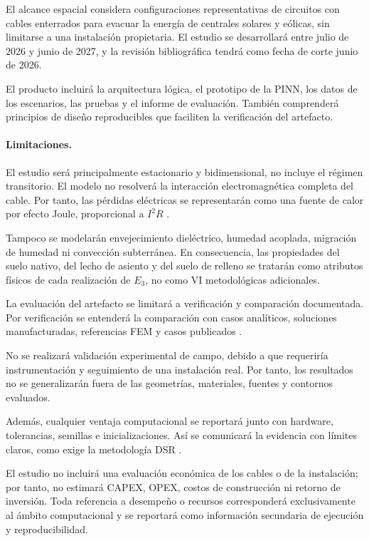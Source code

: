El alcance espacial considera configuraciones representativas de circuitos con cables enterrados para evacuar la energía de centrales solares y eólicas, sin limitarse a una instalación propietaria. El estudio se desarrollará entre julio de 2026 y junio de 2027, y la revisión bibliográfica tendrá como fecha de corte junio de 2026.

El producto incluirá la arquitectura lógica, el prototipo de la PINN, los datos de los escenarios, las pruebas y el informe de evaluación. También comprenderá principios de diseño reproducibles que faciliten la verificación del artefacto.

\paragraph{Limitaciones.}

El estudio será principalmente estacionario y bidimensional, no incluye el régimen transitorio. El modelo no resolverá la interacción electromagnética completa del cable. Por tanto, las pérdidas eléctricas se representarán como una fuente de calor por efecto Joule, proporcional a $I^2R$ \parencites[752--760]{neher1957}[cláusulas 4--5]{iec60287}.

Tampoco se modelarán envejecimiento dieléctrico, humedad acoplada, migración de humedad ni convección subterránea. En consecuencia, las propiedades del suelo nativo, del lecho de asiento y del suelo de relleno se tratarán como atributos físicos de cada realización de $E_3$, no como VI metodológicas adicionales.

La evaluación del artefacto se limitará a verificación y comparación documentada. Por verificación se entenderá la comparación con casos analíticos, soluciones manufacturadas, referencias FEM y casos publicados \parencites{cigre2022}[3--4,93--99]{cigre2025}.

No se realizará validación experimental de campo, debido a que requeriría instrumentación y seguimiento de una instalación real. Por tanto, los resultados no se generalizarán fuera de las geometrías, materiales, fuentes y contornos evaluados.

Además, cualquier ventaja computacional se reportará junto con hardware, tolerancias, semillas e inicializaciones. Así se comunicará la evidencia con límites claros, como exige la metodología DSR \parencite[350--351]{gregor2013}.

El estudio no incluirá una evaluación económica de los cables o de la instalación; por tanto, no estimará CAPEX, OPEX, costos de construcción ni retorno de inversión. Toda referencia a desempeño o recursos corresponderá exclusivamente al ámbito computacional y se reportará como información secundaria de ejecución y reproducibilidad.

